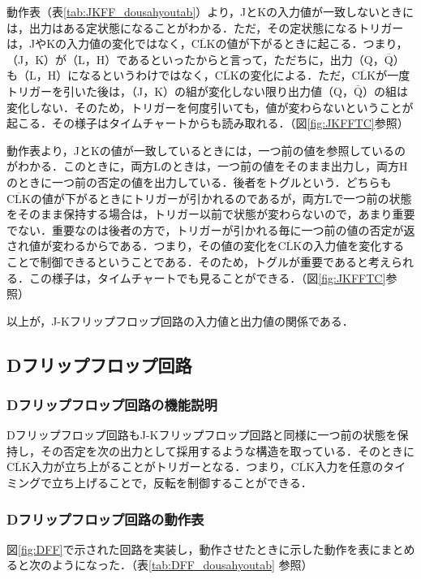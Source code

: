 動作表（表\ref{tab:JKFF_dousahyoutab}）より，JとKの入力値が一致しないときには，出力はある定状態になることがわかる．ただ，その定状態になるトリガーは，JやKの入力値の変化ではなく，$\overline{\mathrm{CLK}}$の値が下がるときに起こる．つまり，（J，K）が（L，H）であるといったからと言って，ただちに，出力（Q，$\overline{\mathrm{Q}}$）も（L，H）になるというわけではなく，$\overline{\mathrm{CLK}}$の変化による．ただ，$\overline{\mathrm{CLK}}$が一度トリガーを引いた後は，（J，K）の組が変化しない限り出力値（Q，$\overline{\mathrm{Q}}$）の組は変化しない．そのため，トリガーを何度引いても，値が変わらないということが起こる．その様子はタイムチャートからも読み取れる．（図\ref{fig:JKFFTC}参照）

動作表より，JとKの値が一致しているときには，一つ前の値を参照しているのがわかる．このときに，両方Lのときは，一つ前の値をそのまま出力し，両方Hのときに一つ前の否定の値を出力している．後者をトグルという．どちらも$\overline{\mathrm{CLK}}$の値が下がるときにトリガーが引かれるのであるが，両方Lで一つ前の状態をそのまま保持する場合は，トリガー以前で状態が変わらないので，あまり重要でない．重要なのは後者の方で，トリガーが引かれる毎に一つ前の値の否定が返され値が変わるからである．つまり，その値の変化を$\overline{\mathrm{CLK}}$の入力値を変化することで制御できるということである．そのため，トグルが重要であると考えられる．この様子は，タイムチャートでも見ることができる．（図\ref{fig:JKFFTC}参照）
\\
\par
以上が，J-Kフリップフロップ回路の入力値と出力値の関係である．

%
%
\subsection{Dフリップフロップ回路}
\label{experiment_Dflipflop}

%
%
\subsubsection{Dフリップフロップ回路の機能説明}
\label{DFF_explain}
Dフリップフロップ回路もJ-Kフリップフロップ回路と同様に一つ前の状態を保持し，その否定を次の出力として採用するような構造を取っている．そのときに$\overline{\mathrm{CLK}}$入力が立ち上がることがトリガーとなる．つまり，$\overline{\mathrm{CLK}}$入力を任意のタイミングで立ち上げることで，反転を制御することができる．

%
%
\subsubsection{Dフリップフロップ回路の動作表}
\label{DFF_dousahyou}
図\ref{fig:DFF}で示された回路を実装し，動作させたときに示した動作を表にまとめると次のようになった．（表\ref{tab:DFF_dousahyoutab} 参照）

